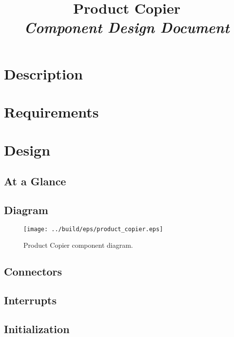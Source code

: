 



\title{\textbf{Product Copier} \\
\large\textit{Component Design Document}}
\date{}
\maketitle

\section{Description}


\section{Requirements}


\section{Design}

\subsection{At a Glance}


\subsection{Diagram}
\begin{figure}[H]
  \texttt{[image: ../build/eps/product\_copier.eps]}
  \caption{Product Copier component diagram.}
\end{figure}

\subsection{Connectors}


\subsection{Interrupts}



\subsection{Initialization}


